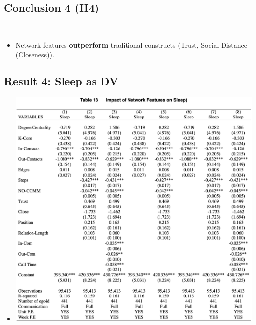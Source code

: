 \documentclass[
  letterpaper,
  DIV=11,
  numbers=noendperiod]{scrartcl}
\providecommand{\tightlist}{%
  \setlength{\itemsep}{0pt}\setlength{\parskip}{0pt}}\usepackage{longtable,booktabs,array}
\begin{document}
\hypertarget{conclusion-4-h4}{%
\subsection{Conclusion 4 (H4)}\label{conclusion-4-h4}}

~

\begin{itemize}
\tightlist
\item
  Network features \textbf{outperform} traditional constructs (Trust,
  Social Distance (Closeness)).
\end{itemize}

\hypertarget{result-4-sleep-as-dv}{%
\subsection{Result 4: Sleep as DV}\label{result-4-sleep-as-dv}}

\begin{itemize}
\tightlist
\item
  \includegraphics{images/2sleep.png}
\end{itemize}
\end{document}
